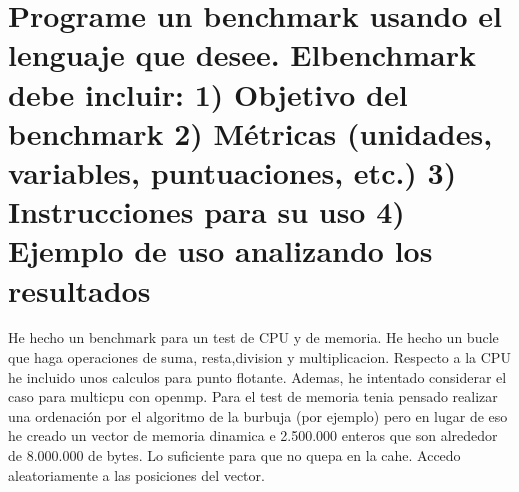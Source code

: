 \section{Programe un benchmark usando el lenguaje que desee. Elbenchmark debe incluir: 1) Objetivo del benchmark 2) Métricas (unidades, variables, puntuaciones, etc.) 3) Instrucciones para su uso 4) Ejemplo de uso analizando los resultados}
He hecho un benchmark para un test de CPU y de memoria.
He hecho un bucle que haga operaciones de suma, resta,division y multiplicacion. 
Respecto a la CPU he incluido unos calculos para punto flotante. Ademas, he intentado considerar el caso para multicpu con openmp.
Para el test de memoria tenia pensado realizar una ordenación por el algoritmo de la burbuja (por ejemplo) pero en lugar de eso he creado un vector de memoria dinamica e 2.500.000 enteros que son alrededor de 8.000.000 de bytes. Lo suficiente para que no quepa en la cahe. Accedo aleatoriamente a las posiciones del vector.
